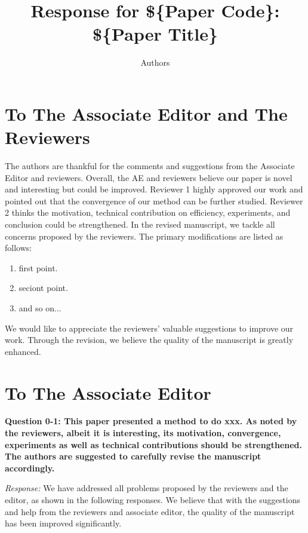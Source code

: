 \documentclass[11pt]{article}
\title{Response for \$\{Paper Code\}: \$\{Paper Title\}}
\author{Authors}
\date{}
\newcommand{\firstquestion}[2]{\noindent\textbf{Question #2: #1}}
\newcommand{\ans}[1]{\emph{\color{red} #1}}
\begin{document}
\maketitle


\section*{To The Associate Editor and The Reviewers}
The authors are thankful for the comments and suggestions from the Associate Editor and reviewers.
Overall, the AE and reviewers believe our paper is novel and interesting but could be improved.
Reviewer 1 highly approved our work and pointed out that the convergence of our method can be further studied.
Reviewer 2 thinks the motivation, technical contribution on efficiency, experiments, and conclusion could be strengthened.
In the revised manuscript, we tackle all concerns proposed by the reviewers.
The primary modifications are listed as follows:
\begin{enumerate}
    \item first point.
    \item seciont point.
    \item and so on...
\end{enumerate}
We would like to appreciate the reviewers' valuable suggestions to improve our work.
Through the revision,
we believe the quality of the manuscript is greatly enhanced.


\section*{To The Associate Editor}
\firstquestion{This paper presented a method to do xxx.
As noted by the reviewers, albeit it is interesting, its motivation, convergence, experiments as well as technical contributions should be strengthened.
The authors are suggested to carefully revise the manuscript accordingly.}{0-1}

\ans{Response:} We have addressed all problems proposed by the reviewers and the editor, as shown in the following responses.
We believe that with the suggestions and help from the reviewers and associate editor,
the quality of the manuscript has been improved significantly. 
\end{document}

